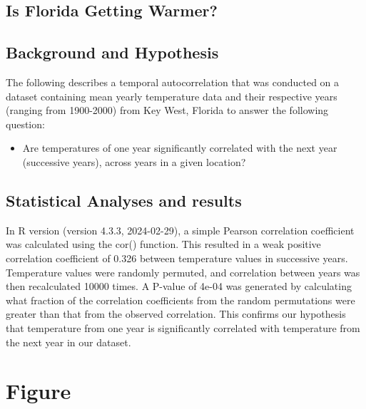 \documentclass{article}
\begin{document}
\begin{center}
    \section*{Is Florida Getting Warmer?}
\end{center}

\subsection*{Background and Hypothesis}

The following describes a temporal autocorrelation that was conducted on a dataset containing mean yearly temperature data and their respective years (ranging from 1900-2000) from Key West, Florida to answer the following question:

\begin{itemize}
    \item  Are temperatures of one year significantly correlated with the next year (successive years), across years in a given location?
\end{itemize}

\subsection*{Statistical Analyses and results}
 In R version (version 4.3.3, 2024-02-29), a simple Pearson correlation coefficient was calculated using the cor() function. This resulted in a weak positive correlation coefficient of 0.326 between temperature values in successive years. Temperature values were randomly permuted, and correlation between years was then recalculated 10000 times. A P-value of 4e-04 was generated by calculating what fraction of the correlation coefficients from the random permutations were greater than that from the observed correlation. This confirms our hypothesis that temperature from one year is significantly correlated with temperature from the next year in our dataset. 
\section*{Figure}
\centering
\vspace{2em}
\end{document}
